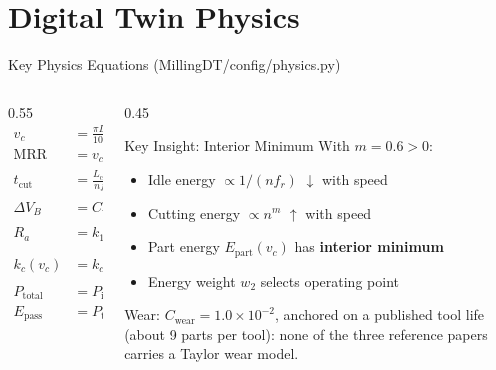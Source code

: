 \documentclass[11pt,aspectratio=169]{beamer}
\newcommand{\MRR}{\mathrm{MRR}}
\newcommand{\Ra}{R_a}
\newcommand{\VB}{V_B}
\begin{document}
\section{Digital Twin Physics}

\begin{frame}{Key Physics Equations (MillingDT/config/physics.py)}
    \small
    \begin{columns}[T]
        \begin{column}{0.55\textwidth}
            \setlength{\jot}{2pt}
            \begin{align}
                v_c &= \frac{\pi D n}{1000} \\
                \MRR &= v_c \cdot a_p \cdot f_r \\
                t_{\text{cut}} &= \frac{L_{\text{cut}}}{n f_r} \\
                \Delta \VB &= C_{\text{wear}} v_c^{\alpha} f_r^{\beta} a_p^{\gamma} t_{\text{cut}} \\
                \Ra &= k_1 f_r^2 + k_2 \VB + \frac{k_3}{v_c} \\
                k_c(v_c) &= k_{c0} \left( \frac{v_c}{v_{\text{ref}}} \right)^m \\
                P_{\text{total}} &= P_{\text{idle}} + k_c(v_c) \cdot \MRR \\
                E_{\text{pass}} &= P_{\text{total}} \cdot t_{\text{cut}}
            \end{align}
        \end{column}
        \begin{column}{0.45\textwidth}
            \begin{alertblock}{Key Insight: Interior Minimum}
            With $m=0.6 > 0$:
            \begin{itemize}
                \item Idle energy $\propto 1/(n f_r)$ $\downarrow$ with speed
                \item Cutting energy $\propto n^m$ $\uparrow$ with speed
                \item Part energy $E_{\text{part}}(v_c)$ has \textbf{interior minimum}
                \item Energy weight $w_2$ selects operating point
            \end{itemize}
            \end{alertblock}
            \vspace{0.2em}
            {\scriptsize
            Wear: $C_{\text{wear}} = 1.0\times10^{-2}$, anchored on a published tool life (about 9
            parts per tool): none of the three reference papers carries a Taylor wear model.}
        \end{column}
    \end{columns}
\end{frame}
\end{document}
